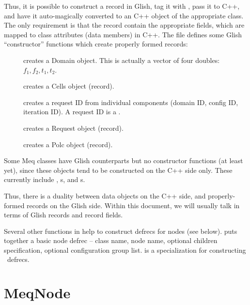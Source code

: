 \documentclass[10pt]{article}
\begin{document}
  Thus, it is possible to construct a record in Glish, tag it with
  , pass it to C++, and have it auto-magically
  converted to an C++ object of the appropriate class. The only requirement is
  that the record contain the appropriate fields, which are mapped to class
  attributes (data members) in C++. The file  defines  some
  Glish ``constructor'' functions which create properly formed records:

  \begin{description}
  
  \item[] creates a Domain object. This is actually a vector
    of four doubles: $f_1,f_2,t_1,t_2$. 

  \item[] creates a Cells object (record).

  \item[] creates a request ID from individual components
  (domain ID, config ID, iteration ID). A request ID is a .
  
  \item[] creates a Request object (record).
  
  \item[] creates a Polc object (record).
  
  \end{description}
  
  Some Meq classes have Glish counterparts but no constructor functions (at
  least yet), since these objects tend to be constructed on the C++ side only.
  These currently include \Vells, \VellSet{}s, and \Result{}s.
  
  Thus, there is a duality between data objects on the C++ side, and
  properly-formed records on the Glish side. Within this document, we will
  usually talk in terms of Glish records and record fields. 

  Several other functions in  help to construct defrecs for
  nodes (see below).  puts together a basic node defrec -- class
  name, node name, optional children specification, optional configuration group
  list.  is a specialization for constructing \Parm\ defrecs.

    
\section{MeqNode}
\end{document}
